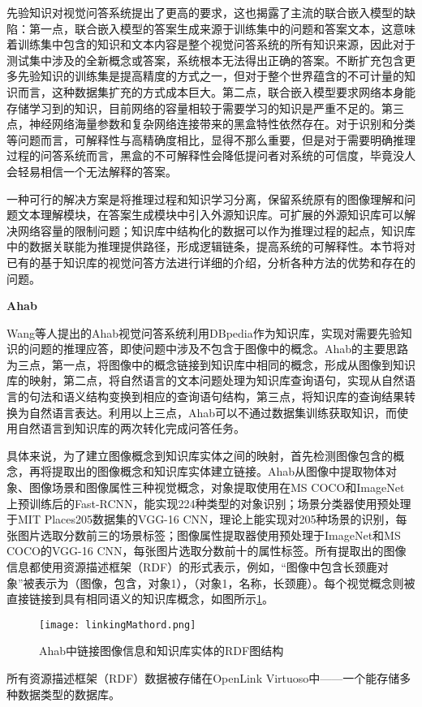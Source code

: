 先验知识对视觉问答系统提出了更高的要求，这也揭露了主流的联合嵌入模型的缺陷：第一点，联合嵌入模型的答案生成来源于训练集中的问题和答案文本，这意味着训练集中包含的知识和文本内容是整个视觉问答系统的所有知识来源，因此对于测试集中涉及的全新概念或答案，系统根本无法得出正确的答案。不断扩充包含更多先验知识的训练集是提高精度的方式之一，但对于整个世界蕴含的不可计量的知识而言，这种数据集扩充的方式成本巨大。第二点，联合嵌入模型要求网络本身能存储学习到的知识，目前网络的容量相较于需要学习的知识是严重不足的。第三点，神经网络海量参数和复杂网络连接带来的黑盒特性依然存在。对于识别和分类等问题而言，可解释性与高精确度相比，显得不那么重要，但是对于需要明确推理过程的问答系统而言，黑盒的不可解释性会降低提问者对系统的可信度，毕竟没人会轻易相信一个无法解释的答案。

一种可行的解决方案是将推理过程和知识学习分离，保留系统原有的图像理解和问题文本理解模块，在答案生成模块中引入外源知识库。可扩展的外源知识库可以解决网络容量的限制问题；知识库中结构化的数据可以作为推理过程的起点，知识库中的数据关联能为推理提供路径，形成逻辑链条，提高系统的可解释性。本节将对已有的基于知识库的视觉问答方法进行详细的介绍，分析各种方法的优势和存在的问题。

\textbf{Ahab}

Wang等人提出的Ahab视觉问答系统利用DBpedia作为知识库，实现对需要先验知识的问题的推理应答，即使问题中涉及不包含于图像中的概念。Ahab的主要思路为三点，第一点，将图像中的概念链接到知识库中相同的概念，形成从图像到知识库的映射，第二点，将自然语言的文本问题处理为知识库查询语句，实现从自然语言的句法和语义结构变换到相应的查询语句结构，第三点，将知识库的查询结果转换为自然语言表达。利用以上三点，Ahab可以不通过数据集训练获取知识，而使用自然语言到知识库的两次转化完成问答任务。

具体来说，为了建立图像概念到知识库实体之间的映射，首先检测图像包含的概念，再将提取出的图像概念和知识库实体建立链接。Ahab从图像中提取物体对象、图像场景和图像属性三种视觉概念，对象提取使用在MS COCO和ImageNet上预训练后的Fast-RCNN，能实现224种类型的对象识别；场景分类器使用预处理于MIT Places205数据集的VGG-16 CNN，理论上能实现对205种场景的识别，每张图片选取分数前三的场景标签；图像属性提取器使用预处理于ImageNet和MS COCO的VGG-16 CNN，每张图片选取分数前十的属性标签。所有提取出的图像信息都使用资源描述框架（RDF）的形式表示，例如，“图像中包含长颈鹿对象”被表示为（图像，包含，对象1），（对象1，名称，长颈鹿）。每个视觉概念则被直接链接到具有相同语义的知识库概念，如图所示\ref{linkingMathord}。
\begin{figure}[H]
	\centering
	\texttt{[image: linkingMathord.png]}
	\caption{Ahab中链接图像信息和知识库实体的RDF图结构}
	\label{linkingMathord}
\end{figure}
所有资源描述框架（RDF）数据被存储在OpenLink Virtuoso中——一个能存储多种数据类型的数据库。

